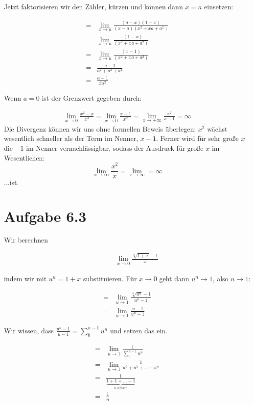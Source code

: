 \documentclass[a4paper,german,12pt,smallheadings]{scrartcl}
\begin{document}
Jetzt faktorisieren wir den Zähler, kürzen und können dann $x = a$ einsetzen:

\begin{align*}
  = &\lim_{x \to a} \frac{(a-x)(1-x)}{(x-a)(x^2 + xa + a^2)} \\
  = &\lim_{x \to a} \frac{-(1-x)}{(x^2 + xa + a^2)} \\
  = &\lim_{x \to a} \frac{(x-1)}{(x^2 + xa + a^2)} \\
  = &\frac{a-1}{a^2 + a^2 + a^2} \\
  = &\frac{a-1}{3a^2}
\end{align*}

Wenn $a = 0$ ist der Grenzwert gegeben durch:

\begin{align*}
  \lim_{x \to 0} \frac{x^2 - x}{x^3} = \lim_{x \to 0} \frac{x - 1}{x^2} = \lim_{x \to \pm\infty} \frac{x^2}{x-1} = \infty
\end{align*}
Die Divergenz können wir uns ohne formellen Beweis überlegen: $x^2$ wächst wesentlich schneller als der Term im Nenner, $x-1$. Ferner wird für sehr große $x$ die $-1$ im Nenner vernachlässigbar, sodass der Ausdruck für große $x$ im Wesentlichen: 
\begin{equation*}
\lim\limits_{x \to \infty}\frac{x^2}{x}=\lim\limits_{x \to \infty}=\infty
\end{equation*}
...ist. 

\section*{Aufgabe 6.3}

Wir berechnen

\begin{align*}
  \qquad&\lim_{x \to 0} \frac{\sqrt[n]{1+x} - 1}{x}
\end{align*}

indem wir mit $u^n = 1+x$ substituieren. Für $x \to 0$ geht dann $u^n \to 1$, also $u \to 1$:

\begin{align*}
  = &\lim_{u \to 1} \frac{\sqrt[n]{u^n} - 1}{u^n -1} \\
  = &\lim_{u \to 1} \frac{u - 1}{u^n -1}
\end{align*}

Wir wissen, dass $\frac{u^n-1}{u-1} = \sum_0^{n-1} u^n$ und setzen das ein.

\begin{align*}
  = &\lim_{u \to 1} \frac{1}{\sum_0^{n-1} u^n} \\
  = &\lim_{u \to 1} \frac{1}{u^0 + u^1 + \dots + u^n} \\
  = &\frac{1}{\underbrace{1 + 1 + \dots + 1}_{n\;\text{Einsen}}} \\
  = &\frac{1}{n}
\end{align*}
\end{document}
